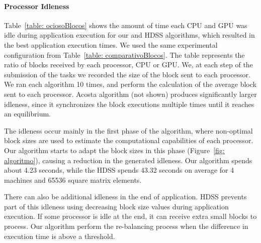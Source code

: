 \documentclass[journal]{IEEEtran}
\begin{document}
\paragraph{Processor Idleness} Table~\ref{table: ociosoBlocos} shows the amount of time each CPU and GPU was
idle during application execution for our and HDSS algorithms, which resulted in
the best application execution times. We used the same experimental
configuration from Table~\ref{table: comparativoBlocos}. The table represents the ratio of blocks received by each processor, CPU or GPU. We, at each step of the submission of the tasks we recorded the size of the block sent to each processor. We ran each algorithm 10 times, and perform the calculation of the average block sent to each processor.
Acosta algorithm (not
shown) produces significantly larger idleness, since it synchronizes the block
executions multiple times until it reaches an equilibrium.

The idleness occur mainly in the first phase of the algorithm, where
non-optimal block sizes are used to estimate the computational capabilities of
each processor. Our algorithm starts to adapt the block sizes in this phase
(Figure~\ref{fig: algoritmo}), causing a reduction in the generated idleness. Our algorithm 
spends about 4.23 seconds, while the HDSS spends 43.32 seconds 
on average for 4 machines and 65536 square matrix elements.

There can also be additional idleness in the end of application. HDSS prevents
part of this idleness using decreasing block size values during application
execution. If some processor is idle at the end, it can receive extra small
blocks to process. Our algorithm perform the re-balancing process when the
difference in execution time is above a threshold. 




%	
\end{document}

